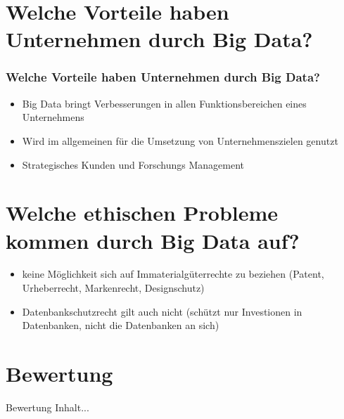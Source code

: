 \documentclass[10pt,a4paper]{beamer}
\begin{document}
\section{Welche Vorteile haben Unternehmen durch Big Data?}
\begin{frame}
\frametitle{Welche Vorteile haben Unternehmen durch Big Data?}
\begin{itemize}
	\item Big Data bringt Verbesserungen in allen Funktionsbereichen eines Unternehmens \pause
	\item Wird im allgemeinen für die Umsetzung von Unternehmenszielen genutzt \pause
	\item Strategisches Kunden und Forschungs Management
\end{itemize}
\end{frame}

\section{Welche ethischen Probleme kommen durch Big Data auf?}
\begin{frame}
\begin{itemize}
\frametitle{Welche ethischen Probleme kommen durch Big Data auf?}
\item keine Möglichkeit sich auf Immaterialgüterrechte zu beziehen (Patent, Urheberrecht, Markenrecht, Designschutz)
\pause
\item Datenbankschutzrecht gilt auch nicht (schützt nur Investionen in Datenbanken, nicht die Datenbanken an sich)
\end{itemize}
\end{frame}

\section{Bewertung}
\begin{frame}{Bewertung}
Inhalt...
\end{frame}
\end{document}

